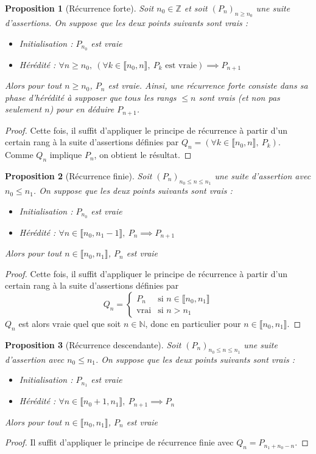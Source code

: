 \documentclass[french]{book}
\newcommand{\N}{\mathbb{N}}
\newcommand{\Z}{\mathbb{Z}}
\theoremstyle{plain}
\newtheorem{prop}{Proposition}[chapter]
\theoremstyle{definition}
\theoremstyle{remark}
\begin{document}
\begin{prop}[Récurrence forte]
	Soit $n_0\in\Z$ et soit $(P_n)_{n\geqslant n_0}$ une suite d'assertions. On suppose que les deux points suivants sont vrais : \begin{itemize}
		\item Initialisation : $P_{n_0}$ est vraie
		\item Hérédité : $\forall n\geqslant n_0,\ (\forall k\in\llbracket n_0,n\rrbracket,\ P_k\text{ est vraie})\implies P_{n+1}$
	\end{itemize}
	Alors pour tout $n\geqslant n_0$, $P_n$ est vraie. Ainsi, une récurrence forte consiste dans sa phase d'hérédité à supposer que $tous$ les rangs $\leqslant n$ sont vrais (et non pas seulement $n$) pour en déduire $P_{n+1}$.
\end{prop}
\begin{proof}
	Cette fois, il suffit d'appliquer le principe de récurrence à partir d'un certain rang à la suite d'assertions définies par $Q_n=(\forall k\in\llbracket n_0,n\rrbracket,\ P_k)$. Comme $Q_n$ implique $P_n$, on obtient le résultat.
\end{proof}
\begin{prop}[Récurrence finie]
	Soit $(P_n)_{n_0\leqslant n\leqslant n_1}$ une suite d'assertion avec $n_0\leqslant n_1$. On suppose que les deux points suivants sont vrais : \begin{itemize}
		\item Initialisation : $P_{n_0}$ est vraie
		\item Hérédité : $\forall n\in\llbracket n_0,n_1-1\rrbracket,\ P_n\implies P_{n+1}$
	\end{itemize}
	Alors pour tout $n\in\llbracket n_0,n_1\rrbracket$, $P_n$ est vraie
\end{prop}
\begin{proof}
	Cette fois, il suffit d'appliquer le principe de récurrence à partir d'un certain rang à la suite d'assertions définies par $$Q_n=\left \{\begin{array}{ll}P_n&\text{si }n\in\llbracket n_0,n_1\rrbracket \\ \text{vrai} & \text{si }n>n_1\end{array}\right.$$ $Q_n$ est alors vraie quel que soit $n\in\N$, donc en particulier pour $n\in\llbracket n_0,n_1\rrbracket$.
\end{proof}
\begin{prop}[Récurrence descendante]
	Soit $(P_n)_{n_0\leqslant n\leqslant n_1}$ une suite d'assertion avec $n_0\leqslant n_1$. On suppose que les deux points suivants sont vrais : \begin{itemize}
		\item Initialisation : $P_{n_1}$ est vraie
		\item Hérédité : $\forall n\in\llbracket n_0+1,n_1\rrbracket,\ P_{n+1}\implies P_{n}$
	\end{itemize}
	Alors pour tout $n\in\llbracket n_0,n_1\rrbracket$, $P_n$ est vraie
\end{prop}
\begin{proof}
	Il suffit d'appliquer le principe de récurrence finie avec $Q_n=P_{n_1+n_0-n}$.
\end{proof}
\end{document}

